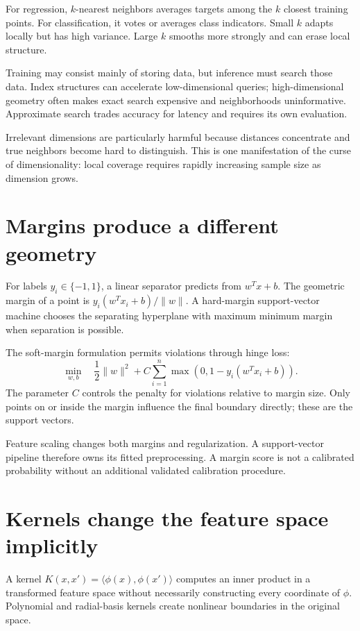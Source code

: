 For regression, $k$-nearest neighbors averages targets among the $k$ closest
training points. For classification, it votes or averages class indicators.
Small $k$ adapts locally but has high variance. Large $k$ smooths more strongly
and can erase local structure.

Training may consist mainly of storing data, but inference must search those
data. Index structures can accelerate low-dimensional queries; high-dimensional
geometry often makes exact search expensive and neighborhoods uninformative.
Approximate search trades accuracy for latency and requires its own evaluation.

Irrelevant dimensions are particularly harmful because distances concentrate
and true neighbors become hard to distinguish. This is one manifestation of the
curse of dimensionality: local coverage requires rapidly increasing sample size
as dimension grows.


\section{Margins produce a different geometry}

For labels $y_i\in\{-1,1\}$, a linear separator predicts from
$w^Tx+b$. The geometric margin of a point is
$y_i(w^Tx_i+b)/\lVert w\rVert$. A hard-margin support-vector machine chooses the
separating hyperplane with maximum minimum margin when separation is possible.

The soft-margin formulation permits violations through hinge loss:
\[
\min_{w,b}\quad \frac{1}{2}\lVert w\rVert^2
+C\sum_{i=1}^n\max(0,1-y_i(w^Tx_i+b)).
\]
The parameter $C$ controls the penalty for violations relative to margin size.
Only points on or inside the margin influence the final boundary directly;
these are the support vectors.

Feature scaling changes both margins and regularization. A support-vector
pipeline therefore owns its fitted preprocessing. A margin score is not a
calibrated probability without an additional validated calibration procedure.

\section{Kernels change the feature space implicitly}

A kernel $K(x,x')=\langle\phi(x),\phi(x')\rangle$ computes an inner product in
a transformed feature space without necessarily constructing every coordinate
of $\phi$. Polynomial and radial-basis kernels create nonlinear boundaries in
the original space.

